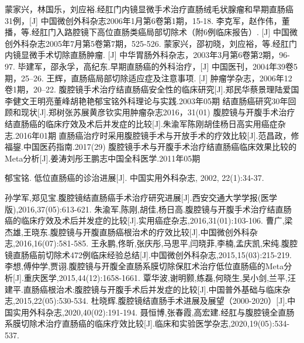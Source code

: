 \documentclass[a4paper,11pt,onecolumn,twoside]{article}
\begin{document}
\begin{multicols}{2}
\begin{thebibliography}{14}
        蒙家兴，林国乐，刘应裕.经肛门内镜显微手术治疗直肠绒毛状腺瘤和早期直肠癌31例，[J] 中国微创外科杂志2006年1月第6卷第1期，15-18.
        李克军，赵作伟，董播，等.经肛门入路腔镜下高位直肠类癌局部切除术（附6例临床报告）. [J] 中国微创外科杂志2005年7月第5卷第7期，525-526.
        蒙家兴，邵初晓，刘应裕，等.经肛门内镜显微手术切除直肠肿瘤. [J] 中华胃肠外科杂志，2003年3月第6卷第2期，96-97.
        毕建军，邵永孚，高纪东.早期直肠癌的外科治疗，[J] 中国医刊，2004年39卷5期，25--26.
        王辉，直肠癌局部切除适应症及注意事项. [J] 肿瘤学杂志，2006年12卷1期，20--22.
        腹腔镜手术治疗结直肠癌安全性的临床研究[J].郑民华蔡景理陆爱国李健文王明亮董峰胡艳艳郁宝铭外科理论与实践.2003年05期
        结直肠癌研究30年回顾和现状[J].郑树张苏展黄彦钦实用肿瘤杂志2016，31(01)
        腹腔镜与开腹手术治疗结直肠癌的临床疗效及术后并发症的比较[J].朱渝军陈刚胡佳杨日高实用癌症杂志.2016年01期
        直肠癌治疗时采用腹腔镜手术与开放手术的疗效比较[J].范昌政，修福鋆.中国医药指南.2017(29)
        腹腔镜手术与开腹手术治疗结直肠癌临床效果比较的Meta分析[J].姜涛刘彤王鹏志中国全科医学.2011年05期


        郁宝铭. 低位直肠癌的诊治进展[J]. 中国实用外科杂志, 2002, 22(1):34-37.

        孙学军,郑见宝.腹腔镜结直肠癌手术治疗研究进展[J].西安交通大学学报(医学版),2016,37(05):613-621.
        朱渝军,陈刚,胡佳,杨日高.腹腔镜与开腹手术治疗结直肠癌的临床疗效及术后并发症的比较[J].实用癌症杂志,2016,31(01):103-106.
        曹广,梁杰雄,王晓东.腹腔镜与开腹直肠癌根治术的疗效比较[J].中国微创外科杂志,2016,16(07):581-585.
        王永鹏,佟昕,张庆彤,马思平,闫晓菲,李楠,孟庆凯,宋纯.腹腔镜直肠癌前切除术472例临床经验总结[J].中国微创外科杂志,2015,15(03):215-219.
        李想,傅仲学,贾诩.腹腔镜与开腹全直肠系膜切除保肛术治疗低位直肠癌的Meta分析[J].重庆医学,2015,44(12):1658-1661.
        覃华波,谢明颢,练磊,何晓生,吴小剑,兰平,汪建平.直肠癌根治术:腹腔镜与开腹手术后并发症的比较[J].中国普外基础与临床杂志,2015,22(05):530-534.
        杜晓辉.腹腔镜结直肠手术进展及展望（2000-2020）[J].中国实用外科杂志,2020,40(02):191-194.
        聂恒博,张春霞,高宏建.经肛与腹腔镜全直肠系膜切除术治疗直肠癌的临床疗效比较[J].临床和实验医学杂志,2020,19(05):534-537.

    \end{thebibliography}
    \normalsize

\end{multicols}


\clearpage
\end{document}
